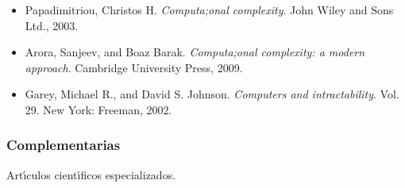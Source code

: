 \documentclass[10 pt]{article}
\begin{document}
 \begin{itemize}[itemsep=0em]
   
 \item{Papadimitriou, Christos H. {\em Computa;onal complexity}. John
     Wiley and Sons Ltd., 2003.}

 \item{Arora, Sanjeev, and Boaz Barak. {\em Computa;onal complexity:
       a modern approach}. Cambridge University Press, 2009.}

 \item{Garey, Michael R., and David S. Johnson. {\em Computers and intractability}. Vol. 29. New York: Freeman, 2002.}

 \end{itemize}
 
\subsubsection{Complementarias}

Art\'{\i}culos cient\'{\i}ficos especializados.

\label{final} %


\end{document}
